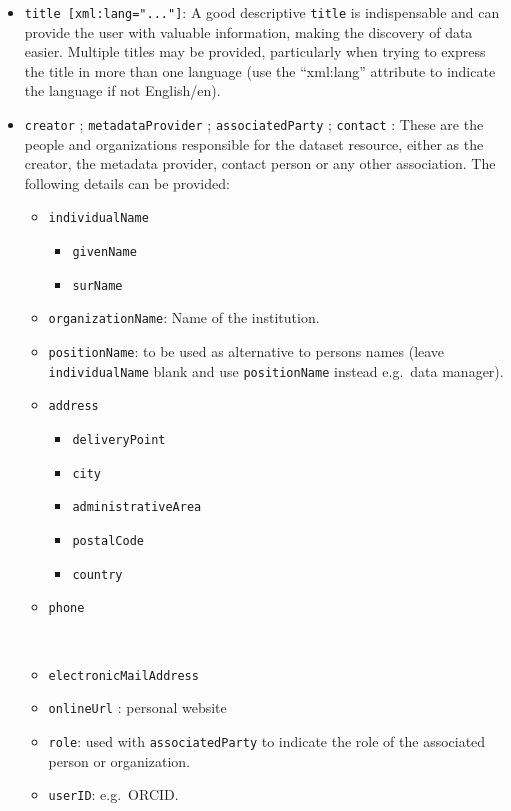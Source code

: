 \documentclass[
  letterpaper,
  DIV=11,
  numbers=noendperiod,
  oneside]{scrreprt}
\providecommand{\tightlist}{%
  \setlength{\itemsep}{0pt}\setlength{\parskip}{0pt}}\usepackage{longtable,booktabs,array}
\begin{document}
\begin{itemize}
\item
  \texttt{title\ {[}xml:lang="..."{]}}: A good descriptive
  \texttt{title} is indispensable and can provide the user with valuable
  information, making the discovery of data easier. Multiple titles may
  be provided, particularly when trying to express the title in more
  than one language (use the ``xml:lang'' attribute to indicate the
  language if not English/en).
\item
  \texttt{creator} ; \texttt{metadataProvider} ;
  \texttt{associatedParty} ; \texttt{contact} : These are the people and
  organizations responsible for the dataset resource, either as the
  creator, the metadata provider, contact person or any other
  association. The following details can be provided:

  \begin{itemize}
  \tightlist
  \item
    \texttt{individualName}

    \begin{itemize}
    \tightlist
    \item
      \texttt{givenName}
    \item
      \texttt{surName}
    \end{itemize}
  \item
    \texttt{organizationName}: Name of the institution.
  \item
    \texttt{positionName}: to be used as alternative to persons names
    (leave \texttt{individualName} blank and use \texttt{positionName}
    instead e.g.~data manager).
  \item
    \texttt{address}

    \begin{itemize}
    \tightlist
    \item
      \texttt{deliveryPoint}
    \item
      \texttt{city}
    \item
      \texttt{administrativeArea}
    \item
      \texttt{postalCode}
    \item
      \texttt{country}
    \end{itemize}
  \item
    \texttt{phone}\strut \\
  \item
    \texttt{electronicMailAddress}
  \item
    \texttt{onlineUrl} : personal website
  \item
    \texttt{role}: used with \texttt{associatedParty} to indicate the
    role of the associated person or organization.
  \item
    \texttt{userID}: e.g.~ORCID.


\end{itemize}
\end{itemize}
\end{document}
